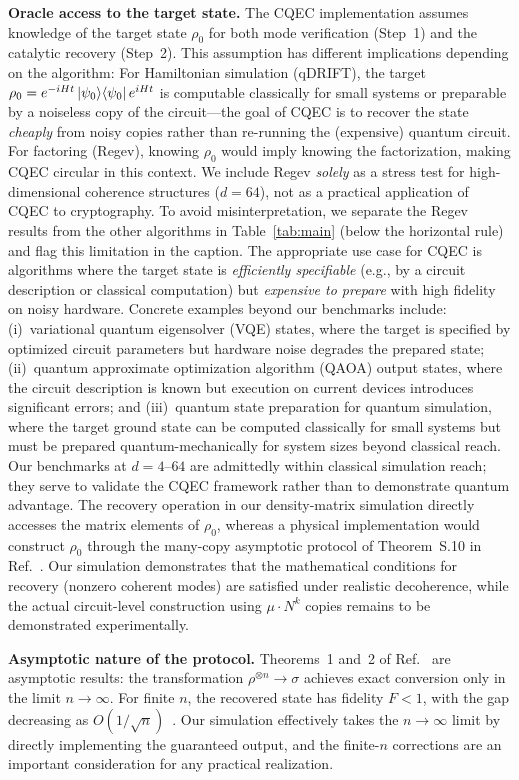 \documentclass[prx,twocolumn,superscriptaddress,longbibliography,floatfix]{revtex4-2}
\begin{document}
\textbf{Oracle access to the target state.}
The CQEC implementation assumes knowledge of the target state $\rho_0$ for both mode verification (Step~1) and the catalytic recovery (Step~2).
This assumption has different implications depending on the algorithm:
For Hamiltonian simulation (qDRIFT), the target $\rho_0 = e^{-iHt}\ket{\psi_0}\!\bra{\psi_0}e^{iHt}$ is computable classically for small systems or preparable by a noiseless copy of the circuit---the goal of CQEC is to recover the state \emph{cheaply} from noisy copies rather than re-running the (expensive) quantum circuit.
For factoring (Regev), knowing $\rho_0$ would imply knowing the factorization, making CQEC circular in this context.
We include Regev \emph{solely} as a stress test for high-dimensional coherence structures ($d = 64$), not as a practical application of CQEC to cryptography.
To avoid misinterpretation, we separate the Regev results from the other algorithms in Table~\ref{tab:main} (below the horizontal rule) and flag this limitation in the caption.
The appropriate use case for CQEC is algorithms where the target state is \emph{efficiently specifiable} (e.g., by a circuit description or classical computation) but \emph{expensive to prepare} with high fidelity on noisy hardware.
Concrete examples beyond our benchmarks include: (i)~variational quantum eigensolver (VQE) states, where the target is specified by optimized circuit parameters but hardware noise degrades the prepared state; (ii)~quantum approximate optimization algorithm (QAOA) output states, where the circuit description is known but execution on current devices introduces significant errors; and (iii)~quantum state preparation for quantum simulation, where the target ground state can be computed classically for small systems but must be prepared quantum-mechanically for system sizes beyond classical reach.
Our benchmarks at $d = 4$--$64$ are admittedly within classical simulation reach; they serve to validate the CQEC framework rather than to demonstrate quantum advantage.
The recovery operation in our density-matrix simulation directly accesses the matrix elements of $\rho_0$, whereas a physical implementation would construct $\rho_0$ through the many-copy asymptotic protocol of Theorem~S.10 in Ref.~\cite{Shiraishi2024}.
Our simulation demonstrates that the mathematical conditions for recovery (nonzero coherent modes) are satisfied under realistic decoherence, while the actual circuit-level construction using $\mu \cdot N^k$ copies remains to be demonstrated experimentally.

\textbf{Asymptotic nature of the protocol.}
Theorems~1 and~2 of Ref.~\cite{Shiraishi2024} are asymptotic results: the transformation $\rho^{\otimes n} \to \sigma$ achieves exact conversion only in the limit $n \to \infty$.
For finite $n$, the recovered state has fidelity $F < 1$, with the gap decreasing as $O(1/\sqrt{n})$~\cite{Shiraishi2024}.
Our simulation effectively takes the $n \to \infty$ limit by directly implementing the guaranteed output, and the finite-$n$ corrections are an important consideration for any practical realization.
\end{document}
